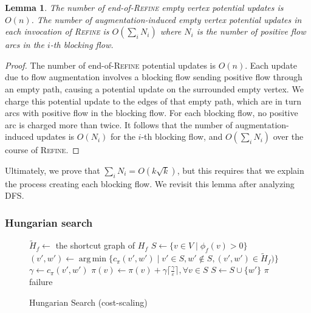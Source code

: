 \documentclass[11pt]{article}
\def\eps{\varepsilon}
\DeclareMathOperator*{\argmin}{arg\,min}
\def\fsupply{\phi}
\theoremstyle{plain}
\newtheorem{lemma}{Lemma}[section]
\numberwithin{figure}{section}
\begin{document}
\begin{lemma}
\label{lemma:empty_updates}
The number of end-of-\textsc{Refine} empty vertex potential updates is $O(n)$.
The number of augmentation-induced empty vertex potential updates in each
invocation of \textsc{Refine} is $O(\sum_i N_i)$ where $N_i$ is the number
of positive flow arcs in the $i$-th blocking flow.
\end{lemma}

\begin{proof}
The number of end-of-\textsc{Refine} potential updates is $O(n)$.
Each update due to flow augmentation involves a blocking flow sending positive
flow through an empty path, causing a potential update on the surrounded
empty vertex.
We charge this potential update to the edges of that empty path, which are in
turn arcs with positive flow in the blocking flow.
For each blocking flow, no positive arc is charged more than twice.
It follows that the number of augmentation-induced updates is $O(N_i)$ for the
$i$-th blocking flow, and $O(\sum_i N_i)$ over the course of \textsc{Refine}.
\end{proof}

Ultimately, we prove that $\sum_i N_i = O(k\sqrt{k})$, but this requires that
we explain the process creating each blocking flow.
We revisit this lemma after analyzing \textsc{DFS}.

\subsubsection{Hungarian search}

\begin{figure*}
\centering
\begin{minipage}{.8\linewidth}
\begin{algorithm}[H]
\caption{Hungarian Search (cost-scaling)}
\begin{algorithmic}[1]
	\State $\tilde{H}_f \gets$ the shortcut graph of $H_f$
	\State $S \gets \{v \in V \mid \fsupply_f(v) > 0\}$
	\Repeat
		\State $(v', w') \gets \argmin\{c_\pi(v', w') \mid v' \in S, w' \not\in S, (v', w') \in \tilde{H}_f)\}$
			\label{line:hs_relaxation}
		\State $\gamma \gets c_\pi(v', w')$
			\State $\pi(v) \gets \pi(v) + \gamma\lceil\frac{\gamma}{\eps}\rceil, \forall v \in S$
		\EndIf
		\State $S \gets S \cup \{w'\}$
		\If{$\fsupply_f(w') < 0$} 
			\State\Return $\pi$
		\EndIf
	\State\Return failure
\EndFunction
\end{algorithmic}
\end{algorithm}
\end{minipage}
\end{figure*}
\end{document}
